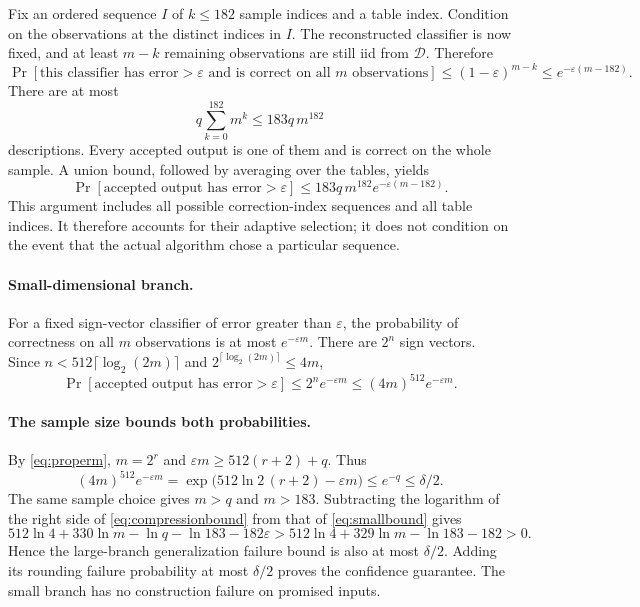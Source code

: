 \documentclass[11pt,a4paper]{article}
\theoremstyle{remark}
\newcommand{\1}{\mathbf 1}
\begin{document}
Fix an ordered sequence $I$ of $k\le182$ sample indices and a table index.
Condition on the observations at the distinct indices in $I$. The reconstructed
classifier is now fixed, and at least $m-k$ remaining observations are still
iid from $\mathcal D$. Therefore
\[
 \Pr[\text{this classifier has error}>\varepsilon
       \text{ and is correct on all }m\text{ observations}]
 \le (1-\varepsilon)^{m-k}
 \le e^{-\varepsilon(m-182)}.
\]
There are at most
\[
 q\sum_{k=0}^{182}m^k\le183q\,m^{182}
\]
descriptions. Every accepted output is one of them and is correct on the
whole sample. A union bound, followed by averaging over the tables, yields
\begin{equation}\label{eq:compressionbound}
 \Pr[\text{accepted output has error}>\varepsilon]
 \le183q\,m^{182}e^{-\varepsilon(m-182)}.
\end{equation}
This argument includes all possible correction-index sequences and all table
indices. It therefore accounts for their adaptive selection; it does not
condition on the event that the actual algorithm chose a particular sequence.

\paragraph{Small-dimensional branch.}
For a fixed sign-vector classifier of error greater than $\varepsilon$, the
probability of correctness on all $m$ observations is at most
$e^{-\varepsilon m}$. There are $2^n$ sign vectors. Since
$n<512\lceil\log_2(2m)\rceil$ and $2^{\lceil\log_2(2m)\rceil}\le4m$,
\begin{equation}\label{eq:smallbound}
 \Pr[\text{accepted output has error}>\varepsilon]
 \le2^n e^{-\varepsilon m}
 \le(4m)^{512}e^{-\varepsilon m}.
\end{equation}

\paragraph{The sample size bounds both probabilities.}
By \eqref{eq:properm}, $m=2^r$ and
$\varepsilon m\ge512(r+2)+q$. Thus
\[
 (4m)^{512}e^{-\varepsilon m}
 =\exp\big(512\ln2\,(r+2)-\varepsilon m\big)
 \le e^{-q}\le\delta/2.
\]
The same sample choice gives $m>q$ and $m>183$. Subtracting the logarithm of
the right side of \eqref{eq:compressionbound} from that of
\eqref{eq:smallbound} gives
\[
 512\ln4+330\ln m-\ln q-\ln183-182\varepsilon
 >
 512\ln4+329\ln m-\ln183-182>0.
\]
Hence the large-branch generalization failure bound is also at most
$\delta/2$. Adding its rounding failure probability at most $\delta/2$ proves
the confidence guarantee. The small branch has no construction failure on
promised inputs.
\end{document}
